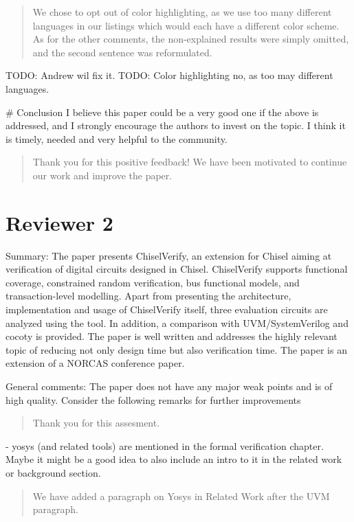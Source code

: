 \documentclass{article}
\newcommand{\todo}[1]{{\color{olive} TODO: #1}}
\newcommand{\reply}[1]{{\color{blue} #1}}
\begin{document}
\begin{quote}
\reply{
We chose to opt out of color highlighting, as we use too many different languages in our listings which would each have a different color scheme.
As for the other comments, the non-explained results were simply omitted, and the second sentence was reformulated.
}
\end{quote}


\todo{Andrew wil fix it.}
\todo{Color highlighting no, as too may different languages.}

\# Conclusion
I believe this paper could be a very good one if the above is addressed, and I strongly encourage the authors to invest on the topic. 
I think it is timely, needed and very helpful to the community.

\begin{quote}
\reply{
Thank you for this positive feedback! We have been motivated to continue our work and improve the paper.
}
\end{quote}


\section*{Reviewer 2}

Summary:
The paper presents ChiselVerify, an extension for Chisel aiming at verification of digital circuits designed in Chisel. ChiselVerify supports functional coverage, constrained random verification, bus functional models, and transaction-level modelling. Apart from presenting the architecture, implementation and usage of ChiselVerify itself, three evaluation circuits are analyzed using the tool. In addition, a comparison with UVM/SystemVerilog and cocoty is provided. The paper is well written and addresses the highly relevant topic of reducing not only design time but also verification time. The paper is an extension of a NORCAS conference paper.

General comments:
The paper does not have any major weak points and is of high quality. Consider the following remarks for further improvements

\begin{quote}
\reply{Thank you for this assesment.}
\end{quote}

- yosys (and related tools) are mentioned in the formal verification chapter. Maybe it might be a good idea to also include an intro to it in the related work or background section.

\begin{quote}
\reply{We have added a paragraph on Yosys in Related Work after the UVM paragraph.}
\end{quote}
\end{document}
